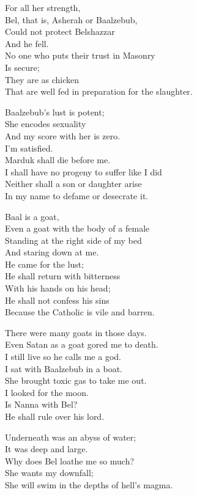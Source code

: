 \documentclass[
]{book}
\begin{document}
For all her strength,\\
Bel, that is, Asherah or Baalzebub,\\
Could not protect Belshazzar\\
And he fell.\\
No one who puts their trust in Masonry\\
Is secure;\\
They are as chicken\\
That are well fed in preparation for the slaughter.

Baalzebub's lust is potent;\\
She encodes sexuality\\
And my score with her is zero.\\
I'm satisfied.\\
Marduk shall die before me.\\
I shall have no progeny to suffer like I did\\
Neither shall a son or daughter arise\\
In my name to defame or desecrate it.

Baal is a goat,\\
Even a goat with the body of a female\\
Standing at the right side of my bed\\
And staring down at me.\\
He came for the lust;\\
He shall return with bitterness\\
With his hands on his head;\\
He shall not confess his sins\\
Because the Catholic is vile and barren.

There were many goats in those days.\\
Even Satan as a goat gored me to death.\\
I still live so he calls me a god.\\
I sat with Baalzebub in a boat.\\
She brought toxic gas to take me out.\\
I looked for the moon.\\
Is Nanna with Bel?\\
He shall rule over his lord.

Underneath was an abyss of water;\\
It was deep and large.\\
Why does Bel loathe me so much?\\
She wants my downfall;\\
She will swim in the depths of hell's magma.
\end{document}
